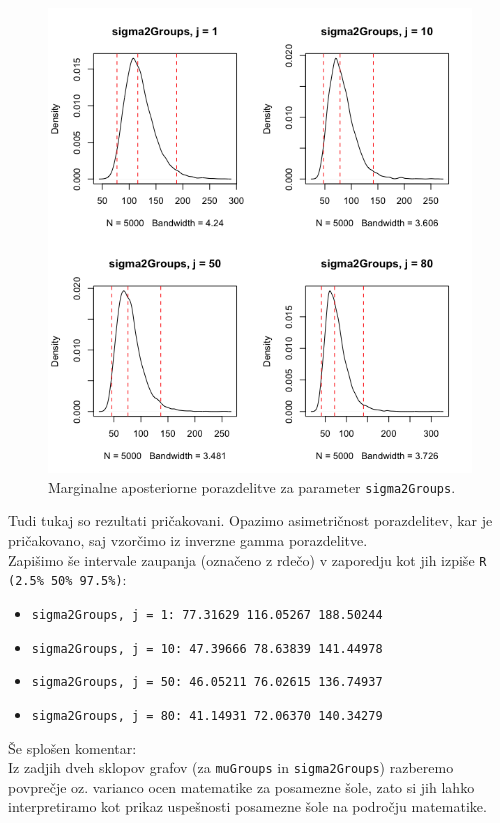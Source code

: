 \documentclass[a4paper,11pt]{article}
\begin{document}
\newpage
\begin{figure}[ht!]
    \centering
    \includegraphics[width = 150mm]{Slike/3_sigma2Groups.png}
    \caption{Marginalne aposteriorne porazdelitve za parameter \texttt{sigma2Groups}.}
\end{figure}
\noindent
Tudi tukaj so rezultati pričakovani. Opazimo asimetričnost porazdelitev, kar je pričakovano, saj vzorčimo iz inverzne gamma porazdelitve.
\\
Zapišimo še intervale zaupanja (označeno z rdečo) v zaporedju kot jih izpiše \texttt{R (2.5\%       50\%     97.5\%)}:
\begin{itemize}
    \item \texttt{sigma2Groups, j = 1: 77.31629 116.05267 188.50244 }
    \item \texttt{sigma2Groups, j = 10: 47.39666  78.63839 141.44978 }
    \item \texttt{sigma2Groups, j = 50: 46.05211  76.02615 136.74937 }
    \item \texttt{sigma2Groups, j = 80: 41.14931  72.06370 140.34279  }
\end{itemize}
\noindent
Še splošen komentar:
\\
Iz zadjih dveh sklopov grafov (za \texttt{muGroups} in \texttt{sigma2Groups}) razberemo povprečje oz. varianco ocen matematike za posamezne šole, zato si jih lahko interpretiramo kot prikaz uspešnosti posamezne šole na področju matematike.
\end{document}

